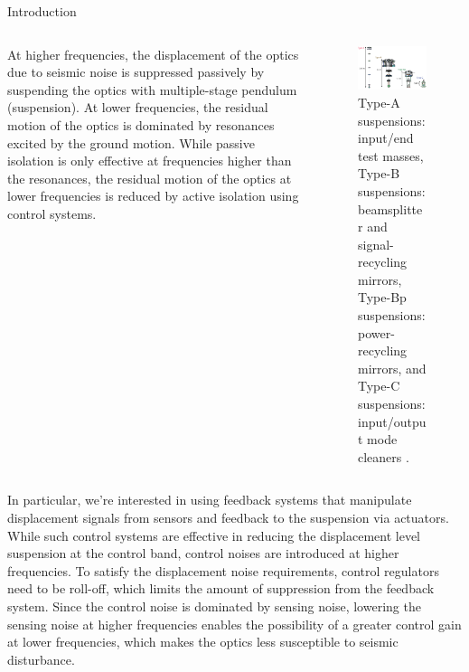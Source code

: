 \documentclass{beamer}
\begin{document}
\begin{frame}[t]
\begin{columns}[t]
\begin{column}{0.32\linewidth}
\begin{block}{Introduction}
				\begin{columns}[t, onlytextwidth]
					\begin{column}{0.4\textwidth}	
						At higher frequencies, the displacement of the optics due to seismic noise is suppressed passively by suspending the optics with multiple-stage pendulum (suspension).
						At lower frequencies, the residual motion of the optics is dominated by resonances excited by the ground motion.
						While passive isolation is only effective at frequencies higher than the resonances, the residual motion of the optics at lower frequencies is reduced by active isolation using control systems.
					\end{column}
					\begin{column}{0.6\textwidth}
						\begin{figure}
							\centering
							\includegraphics[width=0.9\linewidth]{Suspension_types}
							\caption{Type-A suspensions: input/end test masses, Type-B suspensions: beamsplitter and signal-recycling mirrors, Type-Bp suspensions: power-recycling mirrors, and Type-C suspensions: input/output mode cleaners \cite{Akutsu:2021auw}.}
						\end{figure}
					\end{column}
				\end{columns}
				
				\medskip
				
				In particular, we're interested in using feedback systems that manipulate displacement signals from sensors and feedback to the suspension via actuators.
				While such control systems are effective in reducing the displacement level suspension at the control band, control noises are introduced at higher frequencies.
				To satisfy the displacement noise requirements, control regulators need to be roll-off, which limits the amount of suppression from the feedback system.
				Since the control noise is dominated by sensing noise, lowering the sensing noise at higher frequencies enables the possibility of a greater control gain at lower frequencies, which makes the optics less susceptible to seismic disturbance.	
				

\end{block}
\end{column}
\end{columns}
\end{frame}
\end{document}
